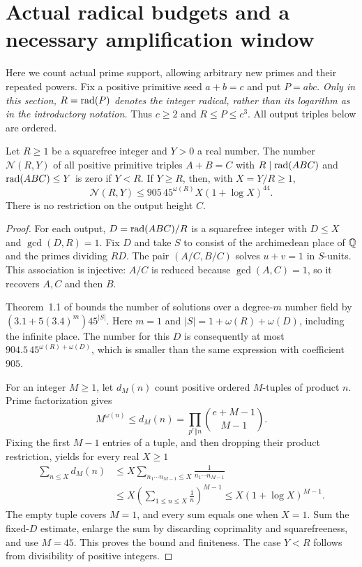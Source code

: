 \section{Actual radical budgets and a necessary amplification window}
\label{sec:actual-radical}

Here we count actual prime support, allowing arbitrary new primes and their
repeated powers. Fix a positive primitive seed $a+b=c$ and put $P=abc$.
\emph{Only in this section, $R=\operatorname{rad}(P)$ denotes the integer radical, rather
than its logarithm as in the introductory notation.}
Thus $c\ge2$ and $R\le P\le c^3$. All output triples below are ordered.

\begin{theorem}
\label{thm:actual-radical-budget}
Let $R\ge1$ be a squarefree integer and $Y>0$ a real number. The number
$\mathcal N(R,Y)$ of all positive primitive triples $A+B=C$ with
$R\mid\operatorname{rad}(ABC)$ and $\operatorname{rad}(ABC)\le Y$ is zero if $Y<R$. If $Y\ge R$,
then, with $X=Y/R\ge1$,
\begin{equation}\label{eq:actual-radical-budget}
 \mathcal N(R,Y)\le905\,45^{\omega(R)}X(1+\log X)^{44}.
\end{equation}
There is no restriction on the output height $C$.
\end{theorem}
\begin{proof}
For each output, $D=\operatorname{rad}(ABC)/R$ is a squarefree integer with
$D\le X$ and $\gcd(D,R)=1$. Fix $D$ and take $S$ to consist of the
archimedean place of $\mathbb Q$ and the primes dividing $RD$. The pair
$(A/C,B/C)$ solves $u+v=1$ in $S$-units. This association is injective:
$A/C$ is reduced because $\gcd(A,C)=1$, so it recovers $A,C$ and then $B$.

Theorem~1.1 of \cite{HKPW} bounds the number of solutions over a
degree-$m$ number field by $(3.1+5(3.4)^m)45^{|S|}$.
Here $m=1$ and $|S|=1+\omega(R)+\omega(D)$, including the infinite place.
The number for this $D$ is consequently at most
$904.5\,45^{\omega(R)+\omega(D)}$, which is smaller than the same
expression with coefficient $905$.

For an integer $M\ge1$, let $d_M(n)$ count positive ordered $M$-tuples
of product $n$. Prime factorization gives
\[
 M^{\omega(n)}\le d_M(n)
 =\prod_{p^e\Vert n}\binom{e+M-1}{M-1}.
\]
Fixing the first $M-1$ entries of a tuple, and then dropping their product
restriction, yields for every real $X\ge1$
\begin{align*}
 \sum_{n\le X}d_M(n)
 &\le X\sum_{n_1\cdots n_{M-1}\le X}\frac1{n_1\cdots n_{M-1}}\\
 &\le X\left(\sum_{1\le n\le X}\frac1n\right)^{M-1}
 \le X(1+\log X)^{M-1}.
\end{align*}
The empty tuple covers $M=1$, and every sum equals one when $X=1$.
Sum the fixed-$D$ estimate, enlarge the sum by discarding coprimality
and squarefreeness, and use $M=45$. This proves the bound and finiteness.
The case $Y<R$ follows from divisibility of positive integers.
\end{proof}

